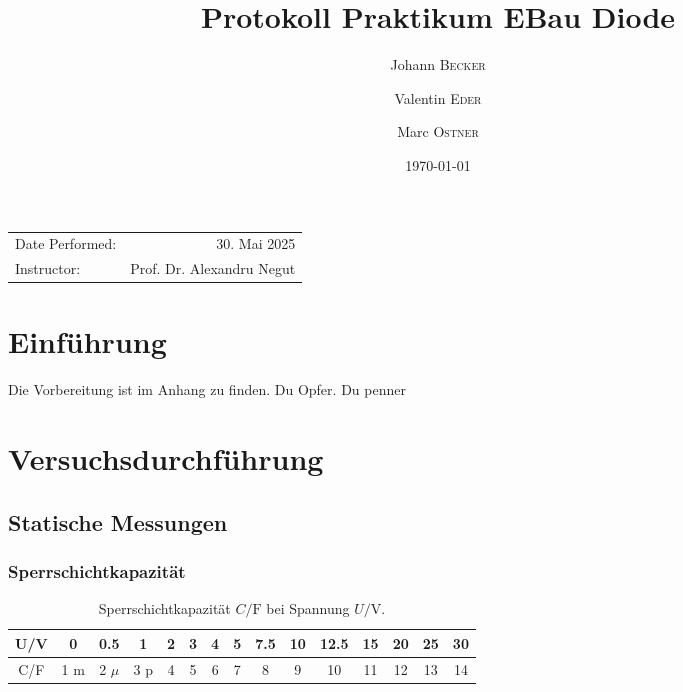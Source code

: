 \documentclass[
	a4paper, %
	12pt, %
]{CSUniSchoolLabReport}
\title{Protokoll Praktikum EBau Diode} %
\author{Johann \textsc{Becker} \and Valentin \textsc{Eder} \and Marc \textsc{Ostner}}
\date{\today} %
\newcommand{\micro}{\ensuremath{\mu}}
\newcommand{\pico}{p}
\newcommand{\milli}{m}
\begin{document}
\maketitle %

\begin{center}
	\begin{tabular}{l r}
		Date Performed: & 30. Mai 2025 \\ %
		
		Instructor: & Prof. Dr. Alexandru Negut %
	\end{tabular}
\end{center}



\section{Einführung}
Die Vorbereitung ist im Anhang zu finden. Du Opfer. Du penner


\section{Versuchsdurchführung}
\subsection{Statische Messungen}
\subsubsection{Sperrschichtkapazität}
\begin{table}[ht]
\centering

\begin{tabular}{c|cccccccccccccc}
U/\si{\volt} & 0 & 0.5 & 1 & 2 & 3 & 4 & 5 & 7.5 & 10 & 12.5 & 15 & 20 & 25 & 30 \\
\hline
C/\si{\farad} & 1 \milli& 2 \micro& 3 \pico& 4 & 5 & 6 & 7 & 8 & 9 & 10 & 11 & 12 & 13 & 14 \\
\end{tabular}
\caption{Sperrschichtkapazität \(C/\si{\farad}\) bei Spannung \(U/\si{\volt}\).}
\label{tab:uv-cf}
\end{table}
\end{document}

